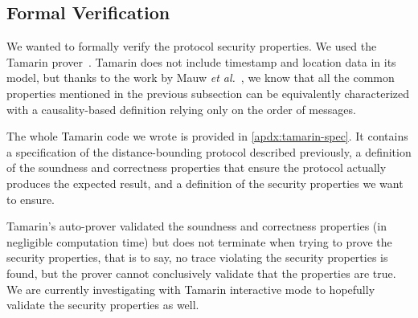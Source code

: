\subsection{Formal Verification}

We wanted to formally verify the protocol security properties. We used the Tamarin prover~\cite{meier2013tamarin}. Tamarin does not include timestamp and location data in its model, but thanks to the work by Mauw \emph{et al.}~\cite{TamarinDB}, we know that all the common properties mentioned in the previous subsection can be equivalently characterized with a causality-based definition relying only on the order of messages.

The whole Tamarin code we wrote is provided in \cref{apdx:tamarin-spec}. It contains a specification of the distance-bounding protocol described previously, a definition of the soundness and correctness properties that ensure the protocol actually produces the expected result, and a definition of the security properties we want to ensure.

Tamarin's auto-prover validated the soundness and correctness properties (in negligible computation time) but does not terminate when trying to prove the security properties, that is to say, no trace violating the security properties is found, but the prover cannot conclusively validate that the properties are true. We are currently investigating with Tamarin interactive mode to hopefully validate the security properties as well.
